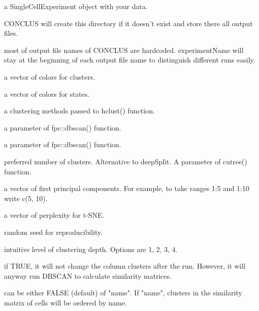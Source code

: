 \documentclass[a4paper]{book}
\begin{document}
\begin{Arguments}
\begin{ldescription}
\item[\code{sceObject}] a SingleCellExperiment object with your data.

\item[\code{dataDirectory}] CONCLUS will create this directory if it doesn't exist and store there all output files.

\item[\code{experimentName}] most of output file names of CONCLUS are hardcoded.
experimentName will stay at the beginning of each output file name to
distinguish different runs easily.

\item[\code{colorPalette}] a vector of colors for clusters.

\item[\code{statePalette}] a vector of colors for states.

\item[\code{clusteringMethod}] a clustering methods passed to hclust() function.

\item[\code{epsilon}] a parameter of fpc::dbscan() function.

\item[\code{minPoints}] a parameter of fpc::dbscan() function.

\item[\code{k}] preferred number of clusters. Alternative to deepSplit. A parameter of cutree() function.

\item[\code{PCs}] a vector of first principal components.
For example, to take ranges 1:5 and 1:10 write c(5, 10).

\item[\code{perplexities}] a vector of perplexity for t-SNE.

\item[\code{randomSeed}] random seed for reproducibility.

\item[\code{deepSplit}] intuitive level of clustering depth. Options are 1, 2, 3, 4.

\item[\code{preClustered}] if TRUE, it will not change the column clusters after the run.
However, it will anyway run DBSCAN to calculate similarity matrices.

\item[\code{orderClusters}] can be either FALSE (default) of "name".
If "name", clusters in the similarity matrix of cells will be ordered by name.


\end{ldescription}
\end{Arguments}
\end{document}

